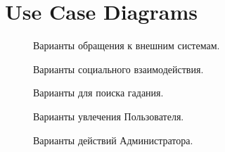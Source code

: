 \section{Use Case Diagrams}

\vspace*{\fill}

\begin{figure}[H]
  \centering
  
  \caption{Варианты обращения к внешним системам.}
\end{figure}

\vspace*{\fill}

\newpage

\begin{figure}
  \centering
  
  \caption{Варианты социального взаимодействия.}
\end{figure}

\newpage

\begin{figure}
  \centering
  
  \caption{Варианты для поиска гадания.}
\end{figure}

\newpage

\begin{figure}
  \centering
  
  \caption{Варианты увлечения Пользователя.}
\end{figure}

\newpage

\begin{figure}
  \centering
  
  \caption{Варианты действий Администратора.}
\end{figure}